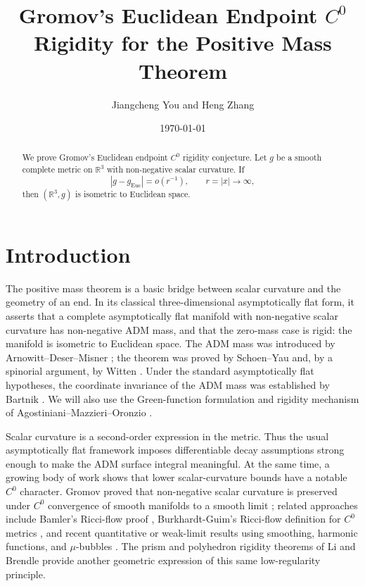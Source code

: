 \documentclass[11pt]{amsart}
\title[Endpoint $C^0$ rigidity]{Gromov's Euclidean Endpoint $C^0$ Rigidity for the Positive Mass Theorem}
\author{Jiangcheng You and Heng Zhang}
\date{\today}
\numberwithin{equation}{section}
\theoremstyle{definition}
\newcommand{\R}{\mathbb R}
\newcommand{\Euc}{\mathrm{Euc}}
\begin{document}
\begin{abstract}
We prove Gromov's Euclidean endpoint $C^0$ rigidity conjecture.  Let $g$ be a smooth complete metric on $\R^3$ with non-negative scalar curvature.  If
$$
        |g-g_{\Euc}|=o(r^{-1}),\qquad r=|x|\to\infty,
$$
then $(\R^3,g)$ is isometric to Euclidean space.
\end{abstract}

\maketitle

\tableofcontents


\section{Introduction}

The positive mass theorem is a basic bridge between scalar curvature and the geometry of an end.  In its classical three-dimensional asymptotically flat form, it asserts that a complete asymptotically flat manifold with non-negative scalar curvature has non-negative ADM mass, and that the zero-mass case is rigid: the manifold is isometric to Euclidean space.  The ADM mass was introduced by Arnowitt--Deser--Misner \cite{ADM}; the theorem was proved by Schoen--Yau \cite{SY1,SY2} and, by a spinorial argument, by Witten \cite{Witten}.  Under the standard asymptotically flat hypotheses, the coordinate invariance of the ADM mass was established by Bartnik \cite{BartnikMass}.  We will also use the Green-function formulation and rigidity mechanism of Agostiniani--Mazzieri--Oronzio \cite{AMO}.

Scalar curvature is a second-order expression in the metric.  Thus the usual asymptotically flat framework imposes differentiable decay assumptions strong enough to make the ADM surface integral meaningful.  At the same time, a growing body of work shows that lower scalar-curvature bounds have a notable $C^0$ character.  Gromov proved that non-negative scalar curvature is preserved under $C^0$ convergence of smooth manifolds to a smooth limit \cite{GromovDiracPlateau,GromovFourLectures}; related approaches include Bamler's Ricci-flow proof \cite{Bamler}, Burkhardt-Guim's Ricci-flow definition for $C^0$ metrics \cite{BurkhardtGuimPointwise}, and recent quantitative or weak-limit results using smoothing, harmonic functions, and $\mu$-bubbles \cite{LeeSmoothing,MYquantification,MYweaklimits}.  The prism and polyhedron rigidity theorems of Li and Brendle \cite{LiPolyhedron,BrendlePolytopes} provide another geometric expression of this same low-regularity principle.
\end{document}
